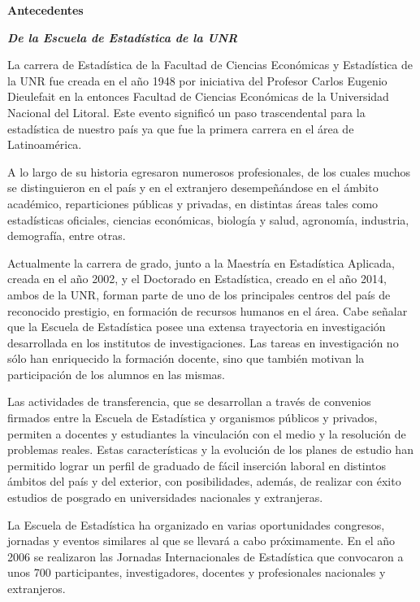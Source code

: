 \vspace*{1cm}

\centerline{\textbf{\LARGE{Antecedentes}}}

\bigbreak

\noindent \textbf{\textit{De la Escuela de Estadística de la UNR}}

La carrera de Estadística de la Facultad de Ciencias Económicas y Estadística de la UNR fue creada en el año 1948 por iniciativa del Profesor Carlos Eugenio Dieulefait en la entonces Facultad de Ciencias Económicas de la Universidad Nacional del Litoral. Este evento significó un paso trascendental para la estadística de nuestro país ya que  fue la primera carrera en el área de Latinoamérica.

A lo largo de su historia egresaron numerosos profesionales, de los cuales muchos se distinguieron en el país y en el extranjero desempeñándose en el ámbito académico, reparticiones públicas y privadas, en distintas áreas tales como  estadísticas oficiales, ciencias económicas, biología y salud, agronomía, industria, demografía, entre otras.

Actualmente la carrera de grado, junto a la Maestría en Estadística Aplicada, creada en el año 2002, y el Doctorado en Estadística, creado en el año 2014, ambos de la UNR, forman parte de uno de los principales centros del país de reconocido prestigio, en formación de recursos humanos en el área. 
Cabe señalar que la Escuela de Estadística posee una extensa trayectoria en investigación desarrollada en los institutos de investigaciones. Las tareas en investigación no sólo han enriquecido la formación docente, sino que también motivan la participación de los alumnos en las mismas. 

Las actividades de transferencia, que se desarrollan a través de convenios firmados entre la Escuela de Estadística y organismos públicos y privados, permiten a docentes y estudiantes la vinculación con el medio y la resolución de problemas reales.
Estas características y la evolución de los planes de estudio han permitido lograr un perfil de graduado de fácil inserción laboral en distintos ámbitos del país y del exterior, con posibilidades, además, de realizar con éxito estudios de posgrado en universidades nacionales y extranjeras.

La Escuela de Estadística ha organizado en varias oportunidades congresos, jornadas y eventos similares al que se llevará a cabo próximamente. En el año 2006 se realizaron las Jornadas Internacionales de Estadística que convocaron a unos 700 participantes, investigadores, docentes y profesionales nacionales y extranjeros.

